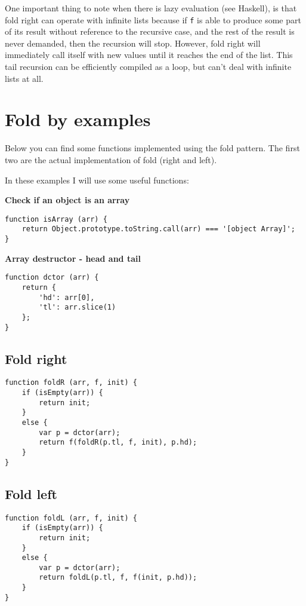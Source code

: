 \documentclass[12pt]{article}
\begin{document}
One important thing to note when there is lazy evaluation (see Haskell),
is that fold right can operate with infinite lists because if \verb|f| is able to produce some part
of its result without reference to the recursive case, and the rest of the result is never demanded,
then the recursion will stop. However, fold right will immediately call itself with new values until
it reaches the end of the list. This tail recursion can be efficiently compiled as a loop,
but can't deal with infinite lists at all. 


\section*{Fold by examples}
Below you can find some functions implemented using the fold pattern. The first two are the actual
implementation of fold (right and left).

In these examples I will use some useful functions:

\newpage

\textbf{Check if an object is an array}
\medskip
\begin{lstlisting}
function isArray (arr) {
	return Object.prototype.toString.call(arr) === '[object Array]';
}
\end{lstlisting}

\textbf{Array destructor - head and tail}
\medskip
\begin{lstlisting}
function dctor (arr) {
	return {
    	'hd': arr[0],
    	'tl': arr.slice(1)
	};
}
\end{lstlisting}

\subsection*{Fold right}
\medskip
\begin{lstlisting}
function foldR (arr, f, init) {
	if (isEmpty(arr)) {
		return init;
	}
	else {
		var p = dctor(arr);
		return f(foldR(p.tl, f, init), p.hd);
	}
}
\end{lstlisting}

\subsection*{Fold left}
\medskip
\begin{lstlisting}
function foldL (arr, f, init) {
	if (isEmpty(arr)) {
		return init;
	}
	else {
		var p = dctor(arr);
		return foldL(p.tl, f, f(init, p.hd));
	}
}
\end{lstlisting}
\end{document}
